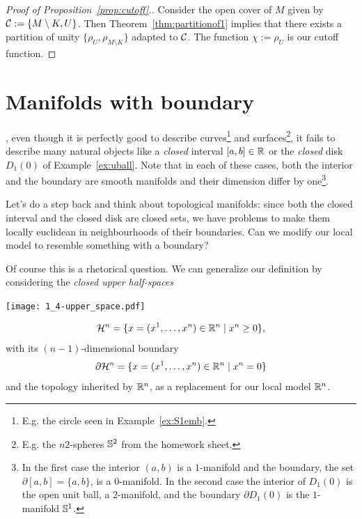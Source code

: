 \begin{proof}[Proof of Proposition~\ref{prop:cutoff}.]
  Consider the open cover of $M$ given by $\mathcal{C}:=\{M\setminus K, U\}$.
  Then Theorem~\ref{thm:partitionof1} implies that there exists a partition of unity $\{\rho_U, \rho_{M\setminus K}\}$ adapted to $\mathcal{C}$. The function $\chi := \rho_U$ is our cutoff function.
\end{proof}

\section{Manifolds with boundary}\label{sec:mbnd}

, even though it is perfectly good to describe curves\footnote{E.g. the circle seen in Example~\ref{ex:S1emb}.} and surfaces\footnote{E.g. the $n
2$-spheres $\mathbb{S}^2$ from the homework sheet.}, it fails to describe many natural objects like a \emph{closed} interval $[a,b]\in\mathbb{R}$ or the \emph{closed} disk $D_1(0)$ of Example~\ref{ex:uball}.
Note that in each of these cases, both the interior and the boundary are smooth manifolds and their dimension differ by one\footnote{In the first case the interior $(a,b)$ is a $1$-manifold and the boundary, the set $\partial[a,b] = \{a,b\}$, is a $0$-manifold. In the second case the interior of $D_1(0)$ is the open unit ball, a $2$-manifold, and the boundary $\partial D_1(0)$ is the $1$-manifold $\mathbb{S}^1$.}.

Let's do a step back and think about topological manifolds: since both the closed interval and the closed disk are closed sets, we have problems to make them locally euclidean in neighbourhoods of their boundaries.
Can we modify our local model to resemble something with a boundary?

Of course this is a rhetorical question.
We can generalize our definition by considering the \emph{closed upper half-spaces}
\begin{marginfigure}[2em]
  \texttt{[image: 1\_4-upper\_space.pdf]}
\end{marginfigure}
\begin{equation}
  \mathcal{H}^n = \{x=(x^1, \ldots, x^n)\in\mathbb{R}^n\mid x^n \geq 0\},
\end{equation}
with its $(n-1)$-dimensional boundary
\begin{equation}
  \partial\mathcal{H}^n = \{x=(x^1, \ldots, x^n)\in\mathbb{R}^n\mid x^n = 0\}
\end{equation}
and the topology inherited by $\mathbb{R}^n$, as a replacement for our local model $\mathbb{R}^n$.

